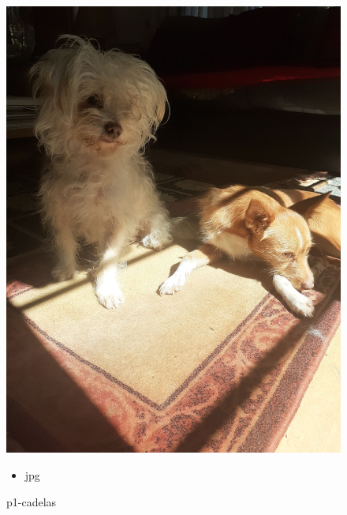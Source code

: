 \documentclass{article}
\begin{document}
		\begin{figure}[ht!]
		\begin{minipage}{0.35\textwidth}
			\centering
			\includegraphics[width=\linewidth]{ManuelVilar/ClaraVilar/DuarteVilar/p1-cadelas.jpg}
			\caption{ p1-cadelas }
		\end{minipage}
		\hspace{1cm} %
		\begin{minipage}{0.3\textwidth}
			\begin{tcolorbox}[colback=white, colframe=black, boxrule=1pt]
				\begin{itemize}
					\item jpg
                    
				\end{itemize}

			\end{tcolorbox}
		\end{minipage}
	\end{figure}
	
\end{document}
